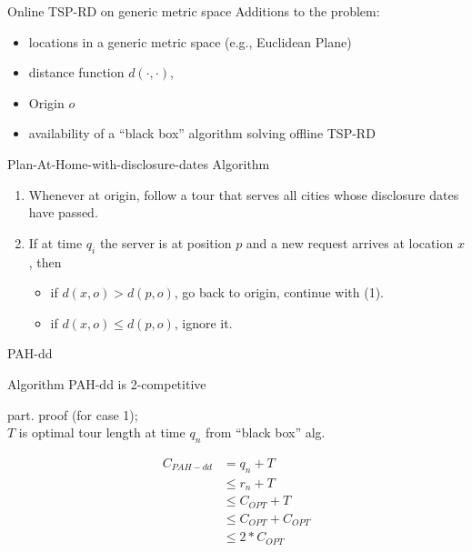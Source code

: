 \begin{frame}{Online TSP-RD on generic metric space}
  Additions to the problem:
  \begin{itemize}
    \item locations in a generic metric space (e.g., Euclidean Plane)
    \item distance function $d(\cdotp,\cdotp)$, 
    \item Origin $o$
    \item availability of a ``black box'' algorithm solving offline TSP-RD
  \end{itemize}
  \vspace{5pt}

  \begin{block}{Plan-At-Home-with-disclosure-dates Algorithm}
    \begin{enumerate}
      \item Whenever at origin, follow a tour that serves all cities whose disclosure dates have passed.
      \item If at time $q_i$ the server is at position $p$ and a new request arrives at location $x$, then
      \begin{itemize}
        \item if $d(x,o) > d(p,o)$, go back to origin, continue with (1).
        \item if $d(x,o) \le d(p,o)$, ignore it.
      \end{itemize}
    \end{enumerate}
  \end{block}
\end{frame}

\begin{frame}{PAH-dd}
  \begin{Theorem}
    Algorithm PAH-dd is 2-competitive
  \end{Theorem}
  \begin{Proof}
    part. proof (for case 1);\\
    $T$ is optimal tour length at time $q_n$ from ``black box'' alg.
    \begin{small}
    \begin{align}
      C_{PAH-dd} & =  q_n + T \\
		 &\le r_n + T \\
		 &\le C_{OPT} + T \\
		 &\le C_{OPT} + C_{OPT} \\
		 &\le 2* C_{OPT}
    \end{align}
    \end{small}
  \end{Proof}
\end{frame}

